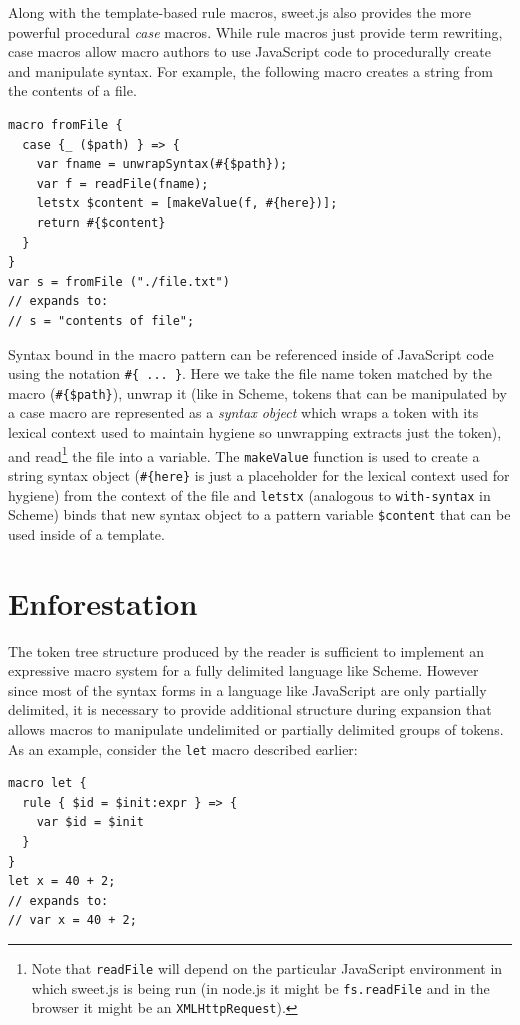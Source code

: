 \documentclass[preprint,10pt]{sigplanconf}
\begin{document}
Along with the template-based rule macros, sweet.js also provides the
more powerful procedural \emph{case} macros. 
While rule macros just provide term rewriting, case macros allow macro authors to use JavaScript code to procedurally create and manipulate syntax. 
For example, the following macro creates a string from the contents of a file.
\begin{lstlisting}
macro fromFile {
  case {_ ($path) } => {
    var fname = unwrapSyntax(#{$path});
    var f = readFile(fname);
    letstx $content = [makeValue(f, #{here})];
    return #{$content}
  }
}
var s = fromFile ("./file.txt")
// expands to:
// s = "contents of file";
\end{lstlisting}
Syntax bound in the macro pattern can be referenced inside of
JavaScript code using the notation \verb!#{ ... }!. Here we take the
file name token matched by the macro (\verb!#{$path}!), unwrap it
(like in Scheme, tokens that can be manipulated by a case macro are
represented as a \emph{syntax object} which wraps a token with its
lexical context used to maintain hygiene so unwrapping extracts just
the token), and read\footnote{Note that \verb!readFile! will depend on
  the particular JavaScript environment in which sweet.js is being run
  (\eg in node.js it might be \verb!fs.readFile! and in the browser it
  might be an \verb!XMLHttpRequest!).} the file into a variable. The
\verb!makeValue! function is used to create a string syntax object
(\verb!#{here}! is just a placeholder for the lexical context used for
hygiene) from the context of the file and \verb!letstx! (analogous to
\verb!with-syntax! in Scheme) binds that new syntax object to a
pattern variable \verb!$content! that can be used inside of a
template.

\section{Enforestation}
\label{sec:enforest}

The token tree structure produced by the reader is sufficient to
implement an expressive macro system for a fully delimited language
like Scheme. However since most of the syntax forms in a language like
JavaScript are only partially delimited, it is necessary to provide
additional structure during expansion that allows macros to manipulate
undelimited or partially delimited groups of tokens. As an example,
consider the \verb!let! macro described earlier:

\begin{lstlisting}
macro let {
  rule { $id = $init:expr } => {
    var $id = $init
  }
}
let x = 40 + 2;
// expands to:
// var x = 40 + 2;
\end{lstlisting}
\end{document}
